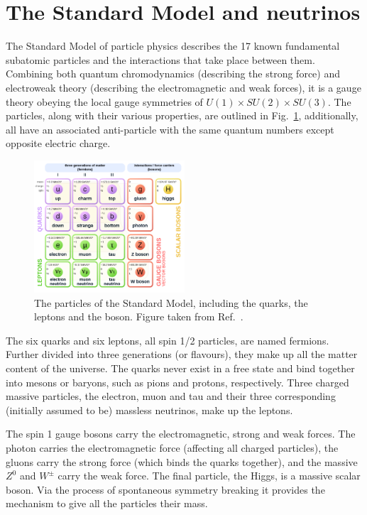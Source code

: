 \section{The Standard Model and neutrinos} %
\label{sec:theory_sm} %

The Standard Model of particle physics describes the 17 known fundamental subatomic particles and
the interactions that take place between them. Combining both quantum chromodynamics (describing
the strong force) and electroweak theory (describing the electromagnetic and weak forces), it is a
gauge theory obeying the local gauge symmetries of $U(1) \times SU(2) \times SU(3)$. The particles,
along with their various properties, are outlined in Fig.~\ref{fig:sm}, additionally, all have an
associated anti-particle with the same quantum numbers except opposite electric charge.

\begin{figure} %
    \includegraphics[origin=c,width=0.5\textwidth]{diagrams/3-theory/sm.png}
    \caption[The particles of the Standard Model]
    {The particles of the Standard Model, including the quarks, the leptons and the boson. Figure
        taken from Ref.~\cite{wiki2020}.}
    \label{fig:sm}
\end{figure}

The six quarks and six leptons, all spin 1/2 particles, are named fermions. Further divided into
three generations (or flavours), they make up all the matter content of the universe. The quarks
never exist in a free state and bind together into mesons or baryons, such as pions and protons,
respectively.  Three charged massive particles, the electron, muon and tau and their three
corresponding (initially assumed to be) massless neutrinos, make up the leptons.

The spin 1 gauge bosons carry the electromagnetic, strong and weak forces. The photon carries the
electromagnetic force (affecting all charged particles), the gluons carry the strong force (which
binds the quarks together), and the massive $Z^{0}$ and $W^{\pm}$ carry the weak force. The final
particle, the Higgs, is a massive scalar boson. Via the process of spontaneous symmetry breaking
it provides the mechanism to give all the particles their mass.

